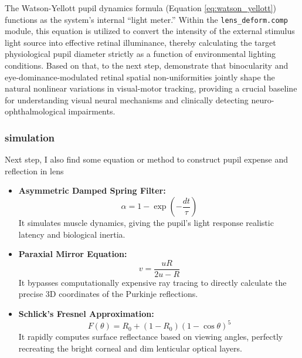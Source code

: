 \documentclass[sigconf, screen]{acmart}
\begin{document}
The Watson-Yellott pupil dynamics formula (Equation \ref{eq:watson_yellott}) functions as the system's internal ``light meter.'' Within the \texttt{lens\_deform.comp} module, this equation is utilized to convert the intensity of the external stimulus light source into effective retinal illuminance, thereby calculating the target physiological pupil diameter strictly as a function of environmental lighting conditions.
Based on that, to the next step, \cite{seyedmadani2025effects} demonstrate that 
binocularity and eye-dominance-modulated retinal spatial non-uniformities jointly 
shape the natural nonlinear variations in visual-motor tracking, providing a 
crucial baseline for understanding visual neural mechanisms and clinically 
detecting neuro-ophthalmological impairments.
\subsubsection{simulation}
Next step, I also find some equation or method to construct pupil expense and reflection in lens
\begin{itemize}
    \item \textbf{Asymmetric Damped Spring Filter:} 
    $$ \alpha = 1 - \exp\left(-\frac{dt}{\tau}\right) $$
    It simulates muscle dynamics, giving the pupil's light response realistic latency and biological inertia.
    
    \item \textbf{Paraxial Mirror Equation:} 
    $$ v = \frac{uR}{2u - R} $$
    It bypasses computationally expensive ray tracing to directly calculate the precise 3D coordinates of the Purkinje reflections.
    
    \item \textbf{Schlick's Fresnel Approximation:} 
    $$ F(\theta) = R_0 + (1 - R_0)(1 - \cos\theta)^5 $$
    It rapidly computes surface reflectance based on viewing angles, perfectly recreating the bright corneal and dim lenticular optical layers.
\end{itemize}
\end{document}
